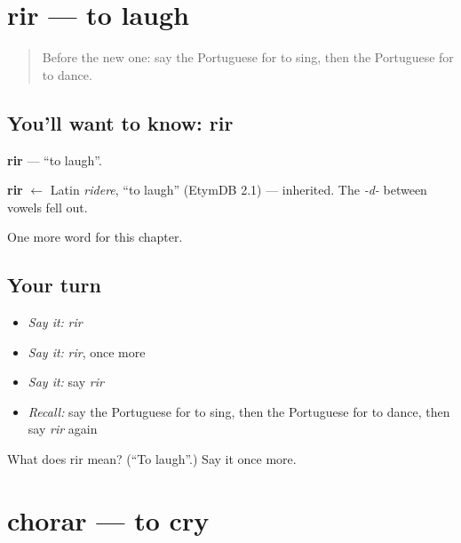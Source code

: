 \section[rir]{rir — to laugh}

\label{lesson:PT-C40-rir}



\begin{quote}
Before the new one: say the Portuguese for to sing, then the Portuguese for to dance.
\end{quote}

\subsection*{You'll want to know: rir}
\textbf{rir} — \textquotedblleft{}to laugh\textquotedblright{}.

\begin{cousinweb}
\textbf{rir} $\leftarrow$ Latin \emph{ridere}, \textquotedblleft{}to laugh\textquotedblright{} (EtymDB 2.1) — inherited. The \emph{-d-} between vowels fell out.
\end{cousinweb}

\begin{grammarlens}[title={What you've built}]
One more word for this chapter.
\end{grammarlens}

\subsection*{Your turn}
\begin{itemize}
\raggedright
  \item \emph{Say it:} \emph{rir}
  \item \emph{Say it:} \emph{rir}, once more
  \item \emph{Say it:} say \emph{rir}
  \item \emph{Recall:} say the Portuguese for to sing, then the Portuguese for to dance, then say \emph{rir} again
\end{itemize}

\begin{tcolorbox}[breakable,colback=teal!4,colframe=teal!35!black,title={Before you move on}]
What does rir mean? (\textquotedblleft{}To laugh\textquotedblright{}.) Say it once more.
\end{tcolorbox}
\section[chorar]{chorar — to cry}

